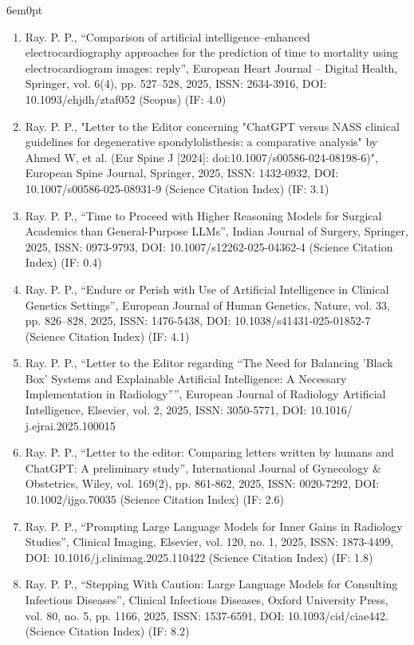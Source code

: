 \documentclass[11pt,a4paper]{moderncv}
\begin{document}
\begin{adjustwidth}{6em}{0pt}
\begin{enumerate}
		\item Ray. P. P., “Comparison of artificial intelligence–enhanced electrocardiography approaches for the prediction of time to mortality using electrocardiogram images: reply”, European Heart Journal – Digital Health, Springer, vol. 6(4), pp. 527–528, 2025, ISSN: 2634-3916, DOI: 10.1093/ehjdh/ztaf052 (Scopus) (IF: 4.0)
		
		\item Ray. P. P.,  "Letter to the Editor concerning "ChatGPT versus NASS clinical guidelines for degenerative spondylolisthesis: a comparative analysis" by Ahmed W, et al. (Eur Spine J [2024]: doi:10.1007/s00586-024-08198-6)", European Spine Journal, Springer, 2025, ISSN: 1432-0932, DOI: 10.1007/s00586-025-08931-9 (Science Citation Index) (IF: 3.1)
		\item Ray. P. P., “Time to Proceed with Higher Reasoning Models for Surgical Academics than General-Purpose LLMs”, Indian Journal of Surgery, Springer, 2025, ISSN: 0973-9793, DOI: 10.1007/s12262-025-04362-4 (Science Citation Index) (IF: 0.4)
		
		\item Ray. P. P., “Endure or Perish with Use of Artificial Intelligence in Clinical Genetics Settings”, European Journal of Human Genetics, Nature, vol. 33, pp. 826–828, 2025, ISSN: 1476-5438, DOI: 10.1038/s41431-025-01852-7 (Science Citation Index) (IF: 4.1)
		
		\item Ray. P. P., “Letter to the Editor regarding “The Need for Balancing 'Black Box' Systems and Explainable Artificial Intelligence: A Necessary Implementation in Radiology””, European Journal of Radiology Artificial Intelligence, Elsevier, vol. 2, 2025, ISSN: 3050-5771, DOI: 10.1016/ j.ejrai.2025.100015 
		
		\item Ray. P. P., “Letter to the editor: Comparing letters written by humans and ChatGPT: A preliminary study”, International Journal of Gynecology \& Obstetrics, Wiley, vol. 169(2), pp. 861-862, 2025, ISSN: 0020-7292, DOI: 10.1002/ijgo.70035 (Science Citation Index) (IF: 2.6)
		
		\item Ray. P. P., “Prompting Large Language Models for Inner Gains in Radiology Studies”, Clinical Imaging, Elsevier, vol. 120, no. 1, 2025, ISSN: 1873-4499, DOI: 10.1016/j.clinimag.2025.110422 (Science Citation Index) (IF: 1.8)
		
		\item Ray. P. P., “Stepping With Caution: Large Language Models for Consulting Infectious Diseases”, Clinical Infectious Diseases, Oxford University Press, vol. 80, no. 5, pp. 1166, 2025, ISSN: 1537-6591, DOI: 10.1093/cid/ciae442. (Science Citation Index) (IF: 8.2)
		

\end{enumerate}
\end{adjustwidth}
\end{document}
